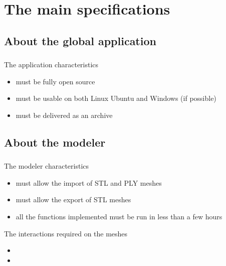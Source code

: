 \documentclass{beamer}
\begin{document}
\section{The main specifications}

\subsection{About the global application}
\begin{frame}
	\frametitle{}
	 \begin{block}{The application characteristics}
		\begin{itemize}
			\item must be fully open source
			\item must be usable on both Linux Ubuntu and Windows (if possible)
			\item must be delivered as an archive
		\end{itemize}
    \end{block}
\end{frame}
    
\subsection{About the modeler}
\begin{frame}
	\frametitle{}
	 \begin{block}{The modeler characteristics}
		\begin{itemize}
			\item must allow the import of STL and PLY meshes
			\item must allow the export of STL meshes
			\item all the functions implemented must be run in less than a few hours
		\end{itemize}
    \end{block}
    
    \begin{block}{The interactions required on the meshes}
		\begin{itemize}
			\item 
			\item 
		\end{itemize}
    \end{block}

\end{frame}
\end{document}
